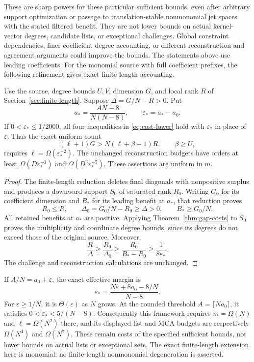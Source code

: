 These are sharp powers for these particular sufficient bounds, even
after arbitrary support optimization or passage to translation-stable
nonmonomial jet spaces with the stated filtered benefit.
They are not lower bounds on actual kernel-vector degrees, candidate
lists, or exceptional challenges. Global constraint dependencies, finer
coefficient-degree accounting, or different reconstruction and agreement
arguments could improve the bounds. The statements above use leading coefficients. For the monomial source
with full coefficient prefixes, the following refinement gives exact
finite-length accounting.


\begin{corollary}
Use the source, degree bounds $U,V$, dimension $G$, and local rank $R$
of Section~\ref{sec:finite-length}. Suppose $\Delta=G/N-R>0$. Put
\[
 a_* =\frac{AN-8}{N(N-8)},\qquad \varepsilon_*=a_*-a_0.
\]
If $0<\varepsilon_*\le1/2000$, all four inequalities in
\eqref{eq:cost-lower} hold with $\varepsilon_*$ in place of
$\varepsilon$. Thus the exact uniform count
\[
 (\ell+1)G>N(\ell+\beta+1)R,\qquad\beta\ge U,
\]
requires $\ell=\Omega(\varepsilon_*^{-2})$. The unchanged reconstruction
budgets have orders at least $\Omega(D\varepsilon_*^{-3})$ and
$\Omega(D^2\varepsilon_*^{-5})$. These assertions are uniform in $m$.
\end{corollary}
\begin{proof}
The finite-length reduction deletes final diagonals with nonpositive
surplus and produces a downward support $S_0$ of saturated rank $R_0$.
Writing $G_0$ for its coefficient dimension and $B_*$ for its leading
benefit at $a_*$, that reduction proves
\[
 R_0\le R,\qquad \Delta_0=G_0/N-R_0\ge\Delta>0,
 \qquad B_*\ge G_0/N.
\]
All retained benefits at $a_*$ are positive. Applying
Theorem~\ref{thm:gap-costs} to $S_0$ proves the multiplicity and coordinate
degree bounds, since its degrees do not exceed those of the original
source. Moreover,
\[
 \frac R\Delta\ge\frac{R_0}{\Delta_0}
 \ge\frac{R_0}{B_*-R_0}\ge\frac1{8\varepsilon_*}.
\]
The challenge and reconstruction calculations are unchanged.
\end{proof}

If $A/N=a_0+\varepsilon$, the exact effective margin is
\[
 \varepsilon_*=
 \frac{N\varepsilon+8a_0-8/N}{N-8}.
\]
For $\varepsilon\ge1/N$, it is $\Theta(\varepsilon)$ as $N$ grows.
At the rounded threshold $A=\lceil Na_0\rceil$, it satisfies
$0<\varepsilon_*<5/(N-8)$. Consequently this framework requires
$m=\Omega(N)$ and $\ell=\Omega(N^2)$ there, and its displayed list and
MCA budgets are respectively $\Omega(N^4)$ and $\Omega(N^7)$.
These remain costs of the specified sufficient bounds, not lower bounds
on actual lists or exceptional sets. The exact finite-length extension
here is monomial; no finite-length nonmonomial degeneration is asserted.
